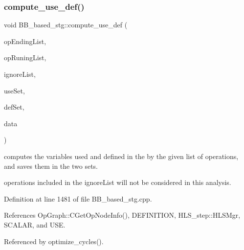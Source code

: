 \subsubsection{\texorpdfstring{compute\+\_\+use\+\_\+def()}{compute\_use\_def()}}
{\footnotesize\ttfamily void B\+B\+\_\+based\+\_\+stg\+::compute\+\_\+use\+\_\+def (\begin{DoxyParamCaption}\item[{const std\+::list$<$ \hyperlink{graph_8hpp_abefdcf0544e601805af44eca032cca14}{vertex} $>$ \&}]{op\+Ending\+List,  }\item[{const std\+::list$<$ \hyperlink{graph_8hpp_abefdcf0544e601805af44eca032cca14}{vertex} $>$ \&}]{op\+Runing\+List,  }\item[{const std\+::list$<$ \hyperlink{graph_8hpp_abefdcf0544e601805af44eca032cca14}{vertex} $>$ \&}]{ignore\+List,  }\item[{\hyperlink{classCustomOrderedSet}{Custom\+Ordered\+Set}$<$ unsigned int $>$ \&}]{use\+Set,  }\item[{\hyperlink{classCustomOrderedSet}{Custom\+Ordered\+Set}$<$ unsigned int $>$ \&}]{def\+Set,  }\item[{const \hyperlink{op__graph_8hpp_a9a0b240622c47584bee6951a6f5de746}{Op\+Graph\+Const\+Ref}}]{data }\end{DoxyParamCaption})\hspace{0.3cm}{\ttfamily [private]}}



computes the variables used and defined in the by the given list of operations, and saves them in the two sets. 

operations included in the ignore\+List will not be considered in this analysis. 

Definition at line 1481 of file B\+B\+\_\+based\+\_\+stg.\+cpp.



References Op\+Graph\+::\+C\+Get\+Op\+Node\+Info(), D\+E\+F\+I\+N\+I\+T\+I\+ON, H\+L\+S\+\_\+step\+::\+H\+L\+S\+Mgr, S\+C\+A\+L\+AR, and U\+SE.



Referenced by optimize\+\_\+cycles().

